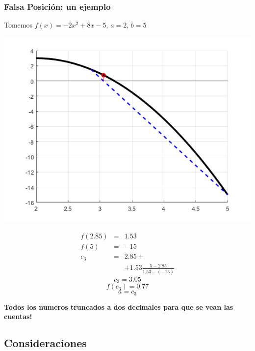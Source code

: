 \documentclass[xcolor=svgnames]{beamer} %
\theoremstyle{plain}
\renewcommand{\textbf}[1]{{\bfseries\textcolor{redUnq2}{#1}}}
\theoremstyle{definition}
\begin{document}
\begin{frame}
\frametitle{Falsa Posición: un ejemplo}
Tomemos $f(x) = -2x^2+8x-5, \, a=2, \, b=5$
\begin{minipage}{.65\linewidth}
\includegraphics[scale=.45]{FalsaPosicion/f3.png} 
\end{minipage} \hspace{-15pt}
\begin{minipage}{.25\linewidth}

$$\begin{array}{ccc}
f(2.85)&=&1.53 \\
f(5)&=&-15 \\

c_3 &=& 2.85 + \\
    & &+ 1.53\frac{5-2.85}{1.53-(-15)} 
\end{array} $$
$$c_3 = 3.05 $$
$$f(c_3) = 0.77 $$
$$ a = c_3$$\vspace{-5pt}

\end{minipage}

\vspace{-3pt}
\textbf{Todos los numeros truncados a dos decimales para que se vean las cuentas!}

\end{frame}

\subsection{Consideraciones}
\end{document}
